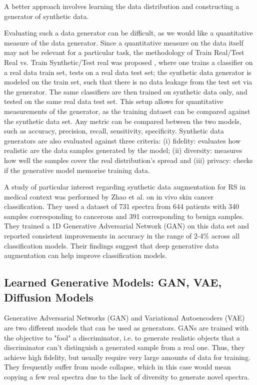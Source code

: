 A better approach involves learning the data distribution and constructing a generator of synthetic data. 

Evaluating such a data generator can be difficult, as we would like a quantitative measure of the data generator. Since a quantitative measure on the data itself may not be relevant for a particular task, the methodology of Train Real/Test Real vs. Train Synthetic/Test real was proposed \cite{esteban2017real}, where one trains a classifier on a real data train set, tests on a real data test set; the synthetic data generator is modeled on the train set, such that there is no data leakage from the test set via the generator. The same classifiers are then trained on synthetic data only, and tested on the same real data test set. This setup allows for quantitative measurements of the generator, as the training dataset can be compared against the synthetic data set. Any metric can be compared between the two models, such as accuracy, precision, recall, sensitivity, specificity. Synthetic data generators are also evaluated against three criteria: (i) fidelity: evaluates how realistic are the data samples generated by the model; (ii) diversity: measures how well the samples cover the real distribution's spread and (iii) privacy: checks if the generative model memorise training data.

A study of particular interest regarding synthetic data augmentation for RS in medical context was performed by Zhao et al. \cite{zhao2024raman} on in vivo skin cancer classification. They used a dataset of 731 spectra from 644 patients with 340 samples corresponding to cancerous and 391 corresponding to benign samples. They trained a 1D Generative Adversarial Network (GAN) on this data set and reported consistent improvements in accuracy in the range of 2-4\% across all classification models. Their findings suggest that deep generative data augmentation can help improve classification models.

\subsection*{Learned Generative Models: GAN, VAE, Diffusion Models}

Generative Adversarial Networks (GAN) \cite{goodfellow2014gan} and Variational Autoencoders (VAE) \cite{kingma2014vae} are two different models that can be used as generators. GANs are trained with the objective to "fool" a discriminator, i.e. to generate realistic objects that a discriminator can't distinguish a generated sample from a real one. Thus, they achieve high fidelity, but usually require very large amounts of data for training. They frequently suffer from mode collapse, which in this case would mean copying a few real spectra due to the lack of diversity to generate novel spectra.

